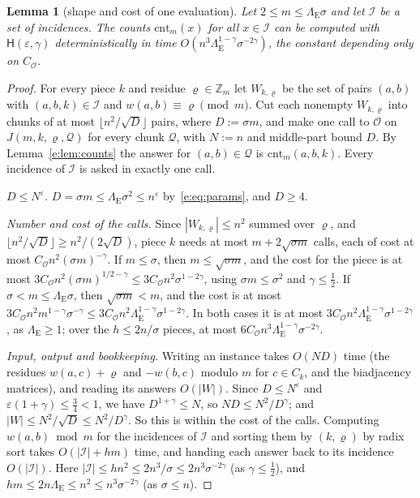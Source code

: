 \documentclass[11pt]{article}
\newtheorem{lemma}[theorem]{Lemma}
\theoremstyle{definition}
\theoremstyle{remark}
\newcommand{\Z}{\mathbb{Z}}
\newcommand{\cnt}{\mathrm{cnt}}
\newcommand{\Iq}{\mathcal{I}}
\newcommand{\Hyp}{\mathsf{H}}
\begin{document}
\begin{lemma}[shape and cost of one evaluation]\label{e:lem:shape}
Let $2\le m\le\Lambda_{\mathrm E}\sigma$ and let $\Iq$ be a set of incidences. The counts $\cnt_m(x)$ for all $x\in\Iq$ can be computed with $\Hyp(\varepsilon,\gamma)$ deterministically in time $O(n^3\Lambda_{\mathrm E}^{1-\gamma}\sigma^{-2\gamma})$, the constant depending only on $C_{\mathcal O}$.
\end{lemma}
\begin{proof}
For every piece $k$ and residue $\varrho\in\Z_m$ let $W_{k,\varrho}$ be the set of pairs $(a,b)$ with $(a,b,k)\in\Iq$ and $w(a,b)\equiv\varrho\pmod m$. Cut each nonempty $W_{k,\varrho}$ into chunks of at most $\lfloor n^2/\sqrt D\rfloor$ pairs, where $D:=\sigma m$, and make one call to $\mathcal O$ on $J(m,k,\varrho,\mathcal Q)$ for every chunk $\mathcal Q$, with $N:=n$ and middle-part bound $D$. By Lemma~\ref{e:lem:counts} the answer for $(a,b)\in\mathcal Q$ is $\cnt_m(a,b,k)$. Every incidence of $\Iq$ is asked in exactly one call.

\emph{$D\le N^\varepsilon$.} $D=\sigma m\le\Lambda_{\mathrm E}\sigma^2\le n^\varepsilon$ by~\eqref{e:eq:params}, and $D\ge4$.

\emph{Number and cost of the calls.} Since $|W_{k,\varrho}|\le n^2$ summed over $\varrho$, and $\lfloor n^2/\sqrt D\rfloor\ge n^2/(2\sqrt D)$, piece $k$ needs at most $m+2\sqrt{\sigma m}$ calls, each of cost at most $C_{\mathcal O}n^2(\sigma m)^{-\gamma}$. If $m\le\sigma$, then $m\le\sqrt{\sigma m}$, and the cost for the piece is at most $3C_{\mathcal O}n^2(\sigma m)^{1/2-\gamma}\le3C_{\mathcal O}n^2\sigma^{1-2\gamma}$, using $\sigma m\le\sigma^2$ and $\gamma\le\frac12$. If $\sigma<m\le\Lambda_{\mathrm E}\sigma$, then $\sqrt{\sigma m}<m$, and the cost is at most $3C_{\mathcal O}n^2m^{1-\gamma}\sigma^{-\gamma}\le3C_{\mathcal O}n^2\Lambda_{\mathrm E}^{1-\gamma}\sigma^{1-2\gamma}$. In both cases it is at most $3C_{\mathcal O}n^2\Lambda_{\mathrm E}^{1-\gamma}\sigma^{1-2\gamma}$, as $\Lambda_{\mathrm E}\ge1$; over the $h\le2n/\sigma$ pieces, at most $6C_{\mathcal O}n^3\Lambda_{\mathrm E}^{1-\gamma}\sigma^{-2\gamma}$.

\emph{Input, output and bookkeeping.} Writing an instance takes $O(ND)$ time (the residues $w(a,c)+\varrho$ and $-w(b,c)$ modulo $m$ for $c\in C_k$, and the biadjacency matrices), and reading its answers $O(|W|)$. Since $D\le N^\varepsilon$ and $\varepsilon(1+\gamma)\le\frac34<1$, we have $D^{1+\gamma}\le N$, so $ND\le N^2/D^\gamma$; and $|W|\le N^2/\sqrt D\le N^2/D^\gamma$. So this is within the cost of the calls. Computing $w(a,b)\bmod m$ for the incidences of $\Iq$ and sorting them by $(k,\varrho)$ by radix sort takes $O(|\Iq|+hm)$ time, and handing each answer back to its incidence $O(|\Iq|)$. Here $|\Iq|\le hn^2\le2n^3/\sigma\le2n^3\sigma^{-2\gamma}$ (as $\gamma\le\frac12$), and $hm\le2n\Lambda_{\mathrm E}\le n^2\le n^3\sigma^{-2\gamma}$ (as $\sigma\le n$).
\end{proof}
\end{document}

